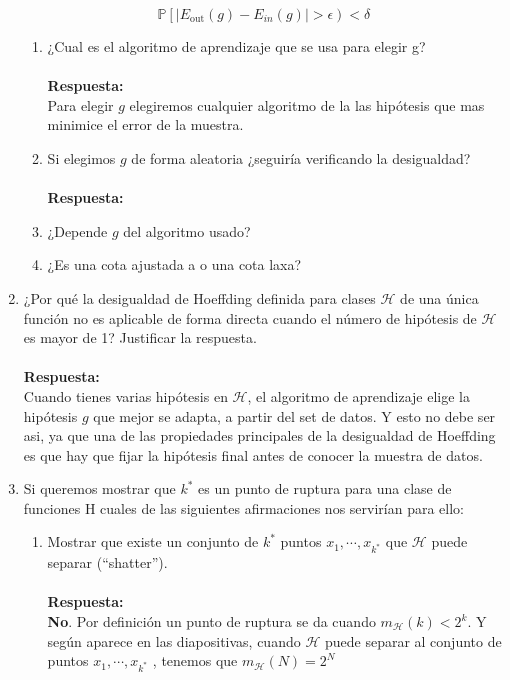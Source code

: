 \documentclass[12pt,a4paper]{article}
\begin{document}
\begin{enumerate}
$$  \mathbb{P}\left[ | E_{\text {out}}(g)-E_{i n}(g) |>\epsilon\right)<\delta
  $$
  \begin{enumerate}
  	\item ¿Cual es el algoritmo de aprendizaje que se usa para elegir g?\\\\
  	\textbf{Respuesta: }\\ Para elegir $g$ elegiremos cualquier algoritmo de la las hipótesis que mas minimice el  error de la muestra. 
  	\item Si elegimos $g$ de forma aleatoria ¿seguiría verificando la desigualdad?\\\\
  	\textbf{Respuesta: }\\
  	\item ¿Depende $g$ del algoritmo usado?
  	\item ¿Es una cota ajustada a o una cota laxa?
  \end{enumerate}
\item ¿Por qué la desigualdad de Hoeffding definida para clases $\mathcal{H}$ de una única función no es aplicable de forma directa cuando el número de hipótesis de $\mathcal{H}$ es mayor de 1? Justificar la respuesta.\\\\
\textbf{Respuesta: }\\
Cuando tienes varias hipótesis en $\mathcal{H}$, el algoritmo de aprendizaje  elige la hipótesis $g$ que mejor se adapta, a partir del set de datos. Y esto no debe ser asi, ya que una de las propiedades principales de la desigualdad de Hoeffding es que hay que fijar la hipótesis final antes de conocer la muestra de datos.
\item Si queremos mostrar que $k^{*}$ es un punto de ruptura para una clase de funciones H cuales de las siguientes afirmaciones nos servirían para ello:
\begin{enumerate}
	\item Mostrar que existe un conjunto de $k^{*}$ puntos $x_1 , \cdots, x_{k^{*}}$ que $\mathcal{H}$ puede separar (“shatter”).\\\\\textbf{Respuesta: }\\\textbf{No}. Por definición un punto de ruptura se da cuando $m_{\mathcal{H}}(k)<2^{k}$. Y según aparece en las diapositivas, cuando $\mathcal{H}$ puede separar al conjunto de puntos $x_1 , \cdots, x_{k^{*}}$ , tenemos que $m_{\mathcal{H}}(N)=2^{N}$
	

\end{enumerate}
\end{enumerate}
\end{document}
